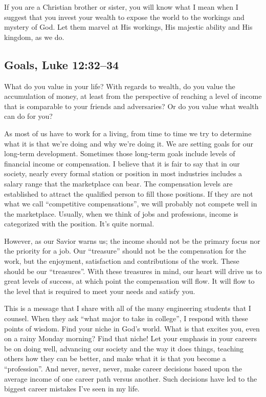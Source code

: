\documentclass[12pt]{memoir}
\begin{document}
If you are a Christian brother or sister, you will know what I mean
when I suggest that you invest your wealth to expose the world to
the workings and mystery of God. Let them marvel at His workings,
His majestic ability and His kingdom, as we do.

\subsection{Goals, Luke 12:32--34}

What do you value in your life? With regards to wealth, do you value
the accumulation of money, at least from the perspective of reaching
a level of income that is comparable to your friends and adversaries?
Or do you value what wealth can do for you? 

As most of us have to work for a living, from time to time we try
to determine what it is that we're doing and why we're doing it. We
are setting goals for our long-term development. Sometimes those long-term
goals include levels of financial income or compensation. I believe
that it is fair to say that in our society, nearly every formal station
or position in most industries includes a salary range that the marketplace
can bear. The compensation levels are established to attract the qualified
person to fill those positions. If they are not what we call ``competitive
compensations'', we will probably not compete well in the marketplace.
Usually, when we think of jobs and professions, income is categorized
with the position. It's quite normal. 

However, as our Savior warns us; the income should not be the primary
focus nor the priority for a job. Our ``treasure'' should not be
the compensation for the work, but the enjoyment, satisfaction and
contributions of the work. These should be our ``treasures''. With
these treasures in mind, our heart will drive us to great levels of
success, at which point the compensation will flow. It will flow to
the level that is required to meet your needs and satisfy you. 

This is a message that I share with all of the many engineering students
that I counsel. When they ask ``what major to take in college'',
I respond with these points of wisdom. Find your niche in God's world.
What is that excites you, even on a rainy Monday morning? Find that
niche! Let your emphasis in your careers be on doing well, advancing
our society and the way it does things, teaching others how they can
be better, and make what it is that you become a ``profession''.
And never, never, never, make career decisions based upon the average
income of one career path versus another. Such decisions have led
to the biggest career mistakes I've seen in my life. 
\end{document}
